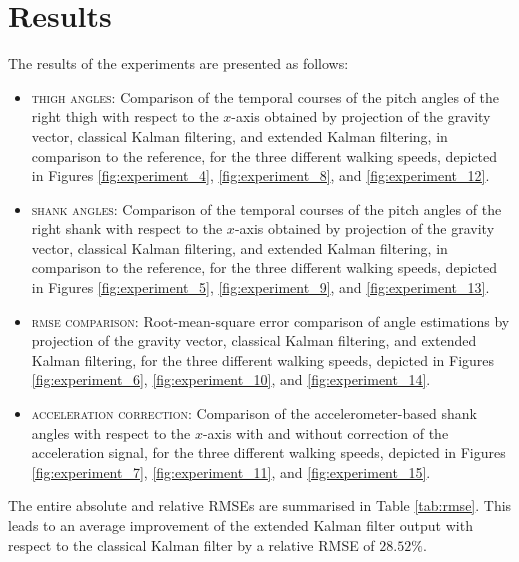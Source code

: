 \section{Results}

The results of the experiments are presented as follows:

\begin{itemize}
  \item \textsc{thigh angles:} Comparison of the temporal courses of the pitch angles of the right thigh with respect to the $x$-axis obtained by projection of the gravity vector, classical Kalman filtering, and extended Kalman filtering, in comparison to the reference, for the three different walking speeds, depicted in Figures \ref{fig:experiment_4}, \ref{fig:experiment_8}, and \ref{fig:experiment_12}.
  \item \textsc{shank angles:} Comparison of the temporal courses of the pitch angles of the right shank with respect to the $x$-axis obtained by projection of the gravity vector, classical Kalman filtering, and extended Kalman filtering, in comparison to the reference, for the three different walking speeds, depicted in Figures \ref{fig:experiment_5}, \ref{fig:experiment_9}, and \ref{fig:experiment_13}.
  \item \textsc{rmse comparison:} Root-mean-square error comparison of angle estimations by projection of the gravity vector, classical Kalman filtering, and extended Kalman filtering, for the three different walking speeds, depicted in Figures \ref{fig:experiment_6}, \ref{fig:experiment_10}, and \ref{fig:experiment_14}.
  \item \textsc{acceleration correction:} Comparison of the accelerometer-based shank angles with respect to the $x$-axis with and without correction of the acceleration signal, for the three different walking speeds, depicted in Figures \ref{fig:experiment_7}, \ref{fig:experiment_11}, and \ref{fig:experiment_15}.
\end{itemize}

\noindent
The entire absolute and relative RMSEs are summarised in Table \ref{tab:rmse}. This leads to an average improvement of the extended Kalman filter output with respect to the classical Kalman filter by a relative RMSE of $28.52\%$.

